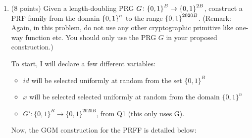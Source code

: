 \documentclass[11pt]{article}
\begin{document}
\begin{enumerate}
\begin{enumerate}
{  Since the output no longer appears uniformly random, and can be predicted, we can conclude that the mentioned GGM Construction is NOT a PRFF.
    }
     \newpage
  \item (8 points) Given a length-doubling PRG $G\colon\zo^B\to\zo^{2B}$, construct a PRF family from the domain $\zo^n$ to the range $\zo^{2020B}$. \newline 
  ({\footnotesize Remark: Again, in this problem, do not use any other cryptographic primitive like one-way function etc. You should only use the PRG $G$ in your proposed construction.}) \newline 
    {\bfseries

      To start, I will declare a few different variables: \newline
   \begin{boxedalgo}
 \begin{itemize}
      \item $id$ will be selected uniformly at random from the set $\{0,1\}^B$
      \item $x$ will be selected selected uniformly at random from the domain $\{0,1\}^{n}$
      \item $G' : \{0,1\}^B  \to \{0,1\}^{2020B}$, from Q1 (this only uses G).
 \end{itemize}
  \end{boxedalgo}
      Now, the GGM construction for the PRFF is detailed below: \newline





\begin{tikzpicture}[x=0.75pt,y=0.75pt,yscale=-1,xscale=1]


\end{tikzpicture}}
\end{enumerate}
\end{enumerate}
\end{document}
